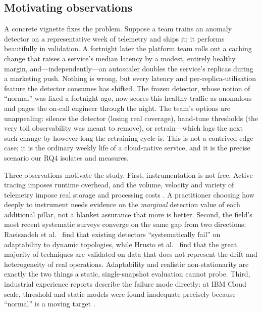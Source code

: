 \documentclass[acmsmall]{acmart}
\begin{document}
\subsection{Motivating observations}\label{sec:motivation}

A concrete vignette fixes the problem. Suppose a team trains an anomaly detector on a representative week of telemetry and ships it; it performs beautifully in validation. A fortnight later the platform team rolls out a caching change that raises a service's median latency by a modest, entirely healthy margin, and---independently---an autoscaler doubles the service's replicas during a marketing push. Nothing is wrong, but every latency and per-replica-utilisation feature the detector consumes has shifted. The frozen detector, whose notion of ``normal'' was fixed a fortnight ago, now scores this healthy traffic as anomalous and pages the on-call engineer through the night. The team's options are unappealing: silence the detector (losing real coverage), hand-tune thresholds (the very toil observability was meant to remove), or retrain---which lags the next such change by however long the retraining cycle is. This is not a contrived edge case; it is the ordinary weekly life of a cloud-native service, and it is the precise scenario our RQ4 isolates and measures.

Three observations motivate the study. First, instrumentation is not free. Active tracing imposes runtime overhead, and the volume, velocity and variety of telemetry impose real storage and processing costs \cite{kosinska2023,leadingobs,hausenblas2023roi,huang2025mint}. A practitioner choosing how deeply to instrument needs evidence on the \emph{marginal} detection value of each additional pillar, not a blanket assurance that more is better. Second, the field's most recent systematic surveys converge on the same gap from two directions: Raeiszadeh et al.\ \cite{raeiszadeh2026} find that existing detectors ``systematically fail'' on adaptability to dynamic topologies, while Hrusto et al.\ \cite{hrusto2026} find that the great majority of techniques are validated on data that does not represent the drift and heterogeneity of real operations. Adaptability and realistic non-stationarity are exactly the two things a static, single-snapshot evaluation cannot probe. Third, industrial experience reports describe the failure mode directly: at IBM Cloud scale, threshold and static models were found inadequate precisely because ``normal'' is a moving target \cite{islam2021}.
\end{document}
